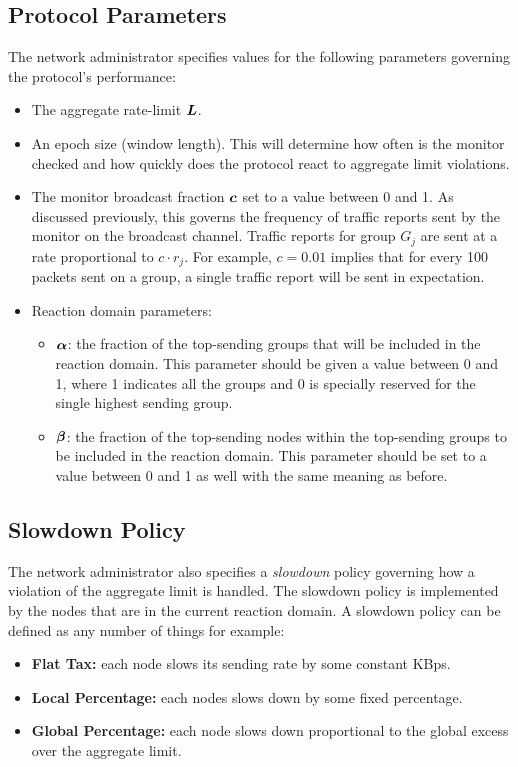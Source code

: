 \subsection{Protocol Parameters}
The network administrator specifies values for the following parameters governing the protocol's performance:
\begin{itemize}
\item The aggregate rate-limit \(\mbox{\boldmath $L$}\).
\item An epoch size (window length). This will determine how often is the monitor checked and how quickly does the protocol react to aggregate limit violations.
\item The monitor broadcast fraction \(\mbox{\boldmath $c$}\) set to a value between 0 and 1. As discussed previously, this governs the frequency of traffic reports sent by the monitor on the broadcast channel. Traffic reports for group $G_j$ are sent at a rate proportional to $c \cdot r_j$. For example, $c=0.01$ implies that for every 100 packets sent on a group, a single traffic report will be sent in expectation.
\item Reaction domain parameters:
	\begin{itemize}
	\item \(\mbox{\boldmath $\alpha$}\): the fraction of the top-sending groups that will be included in the reaction domain. This parameter should be given a value between 0 and 1, where 1 indicates all the groups and 0 is specially reserved for the single highest sending group.
	\item \(\mbox{\boldmath $\beta$}\): the fraction of the top-sending nodes within the top-sending groups to be included in the reaction domain. This parameter should be set to a value between 0 and 1 as well with the same meaning as before.
	\end{itemize}
\end{itemize}

\subsection{Slowdown Policy}
The network administrator also specifies a \textit{slowdown} policy governing how a violation of the aggregate limit is handled. The slowdown policy is implemented by the nodes that are in the current reaction domain. A slowdown policy can be defined as any number of things for example:

\begin{itemize}
\item \textbf{Flat Tax:} each node slows its sending rate by some constant KBps.
\item \textbf{Local Percentage:} each nodes slows down by some fixed percentage.
\item \textbf{Global Percentage:} each node slows down proportional to the global excess over the aggregate limit.
\end{itemize}

